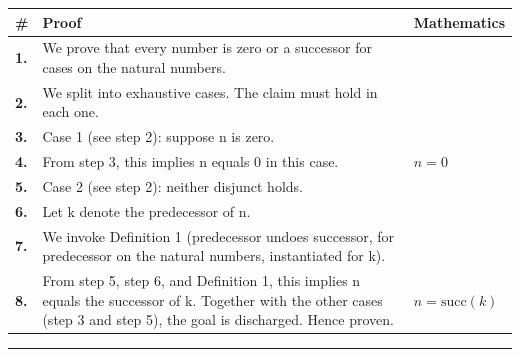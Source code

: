 \documentclass[11pt]{article}
\theoremstyle{definition}
\begin{document}
\begin{tabular}{@{} >{\raggedright\arraybackslash}p{} >{\raggedright\arraybackslash}p{} >{\raggedleft\arraybackslash}p{} @{}}
\textbf{\#} & \textbf{Proof} & \textbf{Mathematics} \\
\midrule
\textbf{1.} & We prove that every number is zero or a successor for cases on the natural numbers. & \\[0.45em]
\textbf{2.} & We split into exhaustive cases. The claim must hold in each one. & \\[0.45em]
\textbf{3.} & Case 1 (see step 2): suppose n is zero. & \\[0.45em]
\textbf{4.} & From step 3, this implies n equals 0 in this case. & $\displaystyle n = 0$ \\[0.45em]
\textbf{5.} & Case 2 (see step 2): neither disjunct holds. & \\[0.45em]
\textbf{6.} & Let k denote the predecessor of n. & \\[0.45em]
\textbf{7.} & We invoke Definition 1 (predecessor undoes successor, for predecessor on the natural numbers, instantiated for k). & \\[0.45em]
\textbf{8.} & From step 5, step 6, and Definition 1, this implies n equals the successor of k. Together with the other cases (step 3 and step 5), the goal is discharged. Hence proven. & $\displaystyle n = \mathrm{succ}(k)$ \\[0.45em]
\bottomrule
\end{tabular}
\label{thm:Nat-cases-every_number_is_zero_or_a_successor}
\par\medskip\hrule
\end{document}
